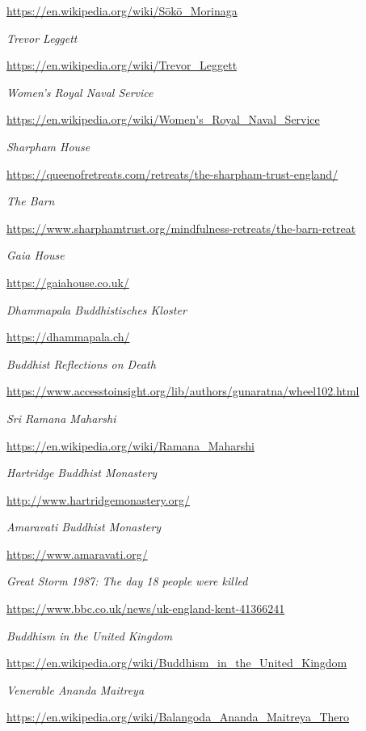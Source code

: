 \begin{thebibliography}{9}
  {\urlsize \url{https://en.wikipedia.org/wiki/Sōkō_Morinaga}}

 \emph{Trevor Leggett}

  {\urlsize \url{https://en.wikipedia.org/wiki/Trevor_Leggett}}

 \emph{Women's Royal Naval Service}

  {\urlsize \url{https://en.wikipedia.org/wiki/Women's_Royal_Naval_Service}}

 \emph{Sharpham House}

  {\urlsize \url{https://queenofretreats.com/retreats/the-sharpham-trust-england/}}

 \emph{The Barn}

  {\urlsize \url{https://www.sharphamtrust.org/mindfulness-retreats/the-barn-retreat}}

 \emph{Gaia House}

  {\urlsize \url{https://gaiahouse.co.uk/}}

 \emph{Dhammapala Buddhistisches Kloster}

  {\urlsize \url{https://dhammapala.ch/}}

 \emph{Buddhist Reflections on Death}

  {\urlsize \url{https://www.accesstoinsight.org/lib/authors/gunaratna/wheel102.html}}

 \emph{Sri Ramana Maharshi}

  {\urlsize \url{https://en.wikipedia.org/wiki/Ramana_Maharshi}}

 \emph{Hartridge Buddhist Monastery}

  {\urlsize \url{http://www.hartridgemonastery.org/}}

 \emph{Amaravati Buddhist Monastery}

  {\urlsize \url{https://www.amaravati.org/}}

 \emph{Great Storm 1987: The day 18 people were killed}

  {\urlsize \url{https://www.bbc.co.uk/news/uk-england-kent-41366241}}

 \emph{Buddhism in the United Kingdom}

  {\urlsize \url{https://en.wikipedia.org/wiki/Buddhism_in_the_United_Kingdom}}

 \emph{Venerable Ananda Maitreya}

  {\urlsize \url{https://en.wikipedia.org/wiki/Balangoda_Ananda_Maitreya_Thero}}


\end{thebibliography}
